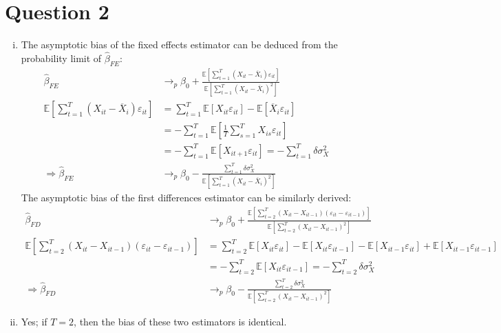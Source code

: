 \documentclass{article}
\newcommand{\olx}[1]{\overline{X}_{#1}}
\newcommand{\eps}{\varepsilon}
\newcommand{\E}[1]{\mathbb{E}\left[#1\right]}%
\begin{document}

\section*{Question 2}

\begin{enumerate}[(i)]
	\item The asymptotic bias of the fixed effects estimator can be deduced from the probability limit of $\hat{\beta}_{FE}$:
		{\small \begin{align*}
			\hat{\beta}_{FE} &\rightarrow_p \beta_0 + \frac{\E{\sum_{t=1}^T(X_{it}-\olx{i})\eps_{it}}}{\E{\sum_{t=1}^T(X_{it}-\olx{i})^2}}	\\
			\E{\sum_{t=1}^T(X_{it}-\olx{i})\eps_{it}} 	&= \sum_{t=1}^T\E{X_{it}\eps_{it}}-\E{\olx{i}\eps_{it}} 							\\
														&= -\sum_{t=1}^T\E{\frac{1}{T}\sum_{s=1}^TX_{is}\eps_{it}}							\\
														&= -\sum_{t=1}^T\E{X_{it+1}\eps_{it}} = -\sum_{t=1}^T\delta\sigma^2_X				\\
			\Rightarrow \hat{\beta}_{FE} &\rightarrow_p \beta_0 - \frac{\sum_{t=1}^T\delta\sigma^2_X}{\E{\sum_{t=1}^T(X_{it}-\olx{i})^2}}	
		\end{align*}}
		The asymptotic bias of the first differences estimator can be similarly derived:
		{\small \begin{align*}
			\hat{\beta}_{FD} 
				&\rightarrow_p \beta_0 + \frac{\E{\sum_{t=2}^T(X_{it}-X_{it-1})(\eps_{it} - \eps_{it-1})}}{\E{\sum_{t=2}^T(X_{it}-X_{it-1})^2}}	\\
			\E{\sum_{t=2}^T(X_{it}-X_{it-1})(\eps_{it} - \eps_{it-1})}
				&= \sum_{t=2}^T\E{X_{it}\eps_{it}} - \E{X_{it}\eps_{it-1}} - \E{X_{it-1}\eps_{it}} + \E{X_{it-1}\eps_{it-1}}					\\
				&= -\sum_{t=2}^T\E{X_{it}\eps_{it-1}} = -\sum_{t=2}^T \delta\sigma^2_X															\\
			\Rightarrow \hat{\beta}_{FD} &\rightarrow_p \beta_0 - \frac{\sum_{t=2}^T \delta\sigma^2_X}{\E{\sum_{t=2}^T(X_{it}-X_{it-1})^2}}	
		\end{align*} }
		
	\item Yes; if $T=2$, then the bias of these two estimators is identical.
	
	
\end{enumerate}


\end{document}
